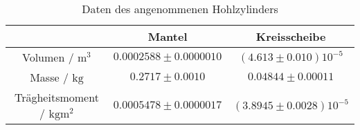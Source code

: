 \begin{table}[h]
	\centering
	\begin{tabular}{ccc}
	\toprule
	&{Mantel}&{Kreisscheibe}\\
	\midrule
{Volumen / $\si{\meter\cubed}$}&$0.0002588\pm0.0000010$&$(4.613\pm0.010)10^{-5}$\\
{Masse / $\si{\kilo\gram}$}&$0.2717\pm0.0010$&$0.04844\pm0.00011$\\
{Trägheitsmoment / $\si{\kilo\gram\meter\squared}$}&$0.0005478\pm0.0000017$&$(3.8945\pm0.0028)10^{-5}$\\
	\bottomrule
	\end{tabular}
	\caption{Daten des angenommenen Hohlzylinders}
	\label{tab:M3 I_Z}
\end{table}
